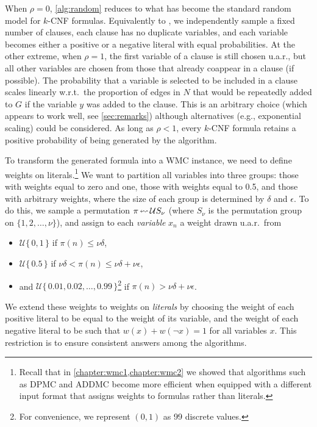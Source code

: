 When $\rho=0$, \cref{alg:random} reduces to what has become the standard random
model for $k$-CNF formulas. Equivalently to \citet{DBLP:journals/dam/FrancoP83},
we independently sample a fixed number of clauses, each clause has no duplicate
variables, and each variable becomes either a positive or a negative literal
with equal probabilities. At the other extreme, when $\rho = 1$, the first
variable of a clause is still chosen u.a.r., but all other variables are chosen
from those that already coappear in a clause (if possible). The probability that
a variable is selected to be included in a clause scales linearly w.r.t.\ the
proportion of edges in $N$ that would be repeatedly added to $G$ if the variable
$y$ was added to the clause. This is an arbitrary choice (which appears to work
well, see \cref{sec:remarks}) although alternatives (e.g., exponential scaling)
could be considered. As long as $\rho < 1$, every $k$-CNF formula retains a
positive probability of being generated by the algorithm.

To transform the generated formula into a WMC instance, we need to define
weights on literals.\footnote{Recall that in \cref{chapter:wmc1,chapter:wmc2} we
  showed that algorithms such as \textsc{DPMC} and \textsc{ADDMC}
  \citep{DBLP:conf/aaai/DudekPV20,DBLP:conf/cp/DudekPV20} become more efficient
  when equipped with a different input format that assigns weights to formulas
  rather than literals.} We want to partition all variables into three groups:
those with weights equal to zero and one, those with weights equal to 0.5, and
those with arbitrary weights, where the size of each group is determined by
$\delta$ and $\epsilon$. To do this, we sample a permutation
$\pi \leftlsquigarrow \mathcal{U}S_\nu$ (where $S_\nu$ is the permutation group
on $\{1, 2, \dots, \nu \}$), and assign to each \emph{variable} $x_n$ a weight
drawn u.a.r.\ from
\begin{itemize}
\item $\mathcal{U}\{\,0, 1\,\}$ if $\pi(n) \le \nu\delta$,
\item $\mathcal{U}\{\,0.5\,\}$ if $\nu\delta < \pi(n) \le \nu\delta +
  \nu\epsilon$,
\item and $\mathcal{U}\{\, 0.01, 0.02, \dots, 0.99 \,\}$\footnote{For
    convenience, we represent $(0, 1)$ as 99 discrete values.} if $\pi(n) >
  \nu\delta + \nu\epsilon$.
\end{itemize}
We extend these weights to weights on \emph{literals} by choosing the weight of
each positive literal to be equal to the weight of its variable, and the weight
of each negative literal to be such that $w(x) + w(\neg x) = 1$ for all
variables $x$. This restriction is to ensure consistent answers among the
algorithms.

